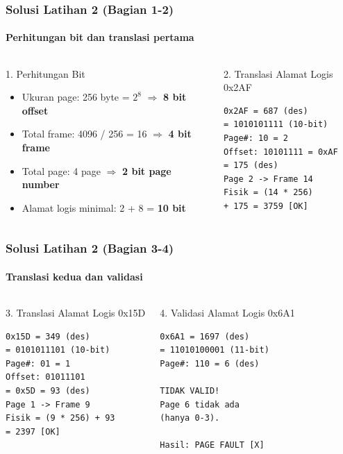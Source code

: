 \documentclass[t,aspectratio=169,xcolor=dvipsnames]{beamer}
\begin{document}
\begin{frame}[fragile]
    \frametitle{Solusi Latihan 2 (Bagian 1-2)}
    \framesubtitle{Perhitungan bit dan translasi pertama}
    \scriptsize

    \begin{columns}[T]
        \begin{block}{1. Perhitungan Bit}
            \begin{itemize}
                \item Ukuran page: 256 byte = $2^8$ $\Rightarrow$ \textbf{8 bit offset}
                \item Total frame: 4096 / 256 = 16 $\Rightarrow$ \textbf{4 bit frame}
                \item Total page: 4 page $\Rightarrow$ \textbf{2 bit page number}
                \item Alamat logis minimal: 2 + 8 = \textbf{10 bit}
            \end{itemize}
        \end{block}

        \begin{block}{2. Translasi Alamat Logis 0x2AF}
            \begin{lstlisting}[basicstyle=\ttfamily\tiny,breaklines=true]
0x2AF = 687 (des)
= 1010101111 (10-bit)
Page#: 10 = 2
Offset: 10101111 = 0xAF
= 175 (des)
Page 2 -> Frame 14
Fisik = (14 * 256)
+ 175 = 3759 [OK]
            \end{lstlisting}
        \end{block}
    \end{columns}
\end{frame}

\begin{frame}[fragile]
    \frametitle{Solusi Latihan 2 (Bagian 3-4)}
    \framesubtitle{Translasi kedua dan validasi}
    \scriptsize

    \begin{columns}[T]
        \begin{block}{3. Translasi Alamat Logis 0x15D}
            \begin{lstlisting}[basicstyle=\ttfamily\tiny,breaklines=true]
0x15D = 349 (des)
= 0101011101 (10-bit)
Page#: 01 = 1
Offset: 01011101
= 0x5D = 93 (des)
Page 1 -> Frame 9
Fisik = (9 * 256) + 93
= 2397 [OK]
            \end{lstlisting}
        \end{block}

        \begin{block}{4. Validasi Alamat Logis 0x6A1}
            \begin{lstlisting}[basicstyle=\ttfamily\tiny,breaklines=true]
0x6A1 = 1697 (des)
= 11010100001 (11-bit)
Page#: 110 = 6 (des)

TIDAK VALID!
Page 6 tidak ada
(hanya 0-3).

Hasil: PAGE FAULT [X]
            \end{lstlisting}
        \end{block}
    \end{columns}
\end{frame}
\end{document}
